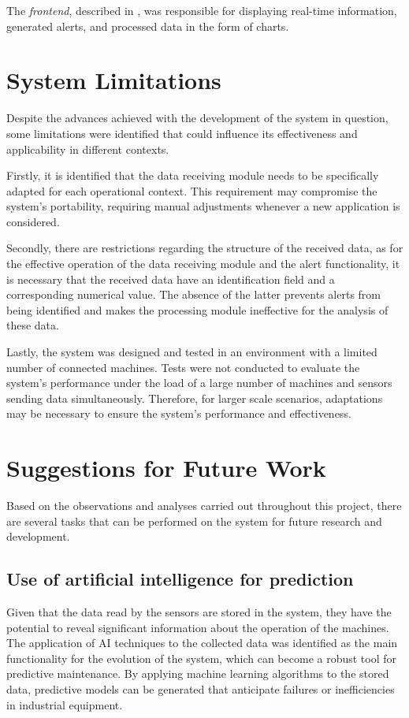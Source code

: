 The \emph{frontend}, described in \label{sec:implFront}, was responsible for displaying real-time information, generated alerts, and processed data in the form of charts.

\section{System Limitations}\label{sec:limitations}

Despite the advances achieved with the development of the system in question, some limitations were identified that could influence its effectiveness and applicability in different contexts.

Firstly, it is identified that the data receiving module needs to be specifically adapted for each operational context. This requirement may compromise the system's portability, requiring manual adjustments whenever a new application is considered.

Secondly, there are restrictions regarding the structure of the received data, as for the effective operation of the data receiving module and the alert functionality, it is necessary that the received data have an identification field and a corresponding numerical value. The absence of the latter prevents alerts from being identified and makes the processing module ineffective for the analysis of these data.

Lastly, the system was designed and tested in an environment with a limited number of connected machines. Tests were not conducted to evaluate the system's performance under the load of a large number of machines and sensors sending data simultaneously. Therefore, for larger scale scenarios, adaptations may be necessary to ensure the system's performance and effectiveness.


\section{Suggestions for Future Work}\label{sec:future_work}

Based on the observations and analyses carried out throughout this project, there are several tasks that can be performed on the system for future research and development.


\subsection{Use of artificial intelligence for prediction}

Given that the data read by the sensors are stored in the system, they have the potential to reveal significant information about the operation of the machines. The application of \gls{AI} techniques to the collected data was identified as the main functionality for the evolution of the system, which can become a robust tool for predictive maintenance. By applying machine learning algorithms to the stored data, predictive models can be generated that anticipate failures or inefficiencies in industrial equipment.

